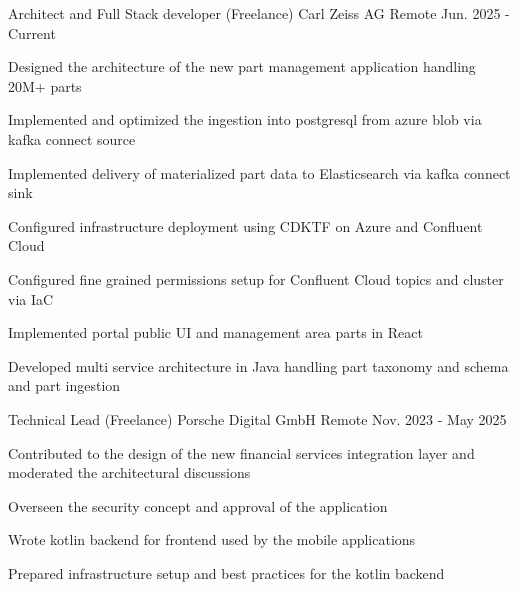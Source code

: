 
\begin{cventries}

  \cventry
    {Architect and Full Stack developer (Freelance)} %
    {Carl Zeiss AG} %
    {Remote} %
    {Jun. 2025 - Current} %
    {
      \begin{cvitems} %
        \item {Designed the architecture of the new part management application handling 20M+ parts}
        \item {Implemented and optimized the ingestion into postgresql from azure blob via kafka connect source}
        \item {Implemented delivery of materialized part data to Elasticsearch via kafka connect sink}
        \item {Configured infrastructure deployment using CDKTF on Azure and Confluent Cloud}
        \item {Configured fine grained permissions setup for Confluent Cloud topics and cluster via IaC}
        \item {Implemented portal public UI and management area parts in React}
        \item {Developed multi service architecture in Java handling part taxonomy and schema and part ingestion}
      \end{cvitems}
    }

  \cventry
    {Technical Lead (Freelance)} %
    {Porsche Digital GmbH} %
    {Remote} %
    {Nov. 2023 - May 2025} %
    {
      \begin{cvitems} %
        \item {Contributed to the design of the new financial services integration layer and moderated the architectural discussions}
        \item {Overseen the security concept and approval of the application}
        \item {Wrote kotlin backend for frontend used by the mobile applications}
        \item {Prepared infrastructure setup and best practices for the kotlin backend}
      \end{cvitems}
    }


\end{cventries}
